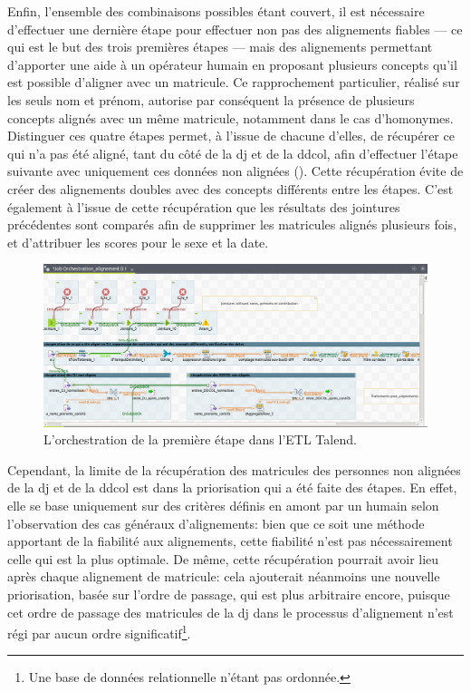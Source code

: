 \noindent Enfin, l'ensemble des combinaisons possibles étant couvert, il est nécessaire d'effectuer une dernière étape pour effectuer non pas des alignements fiables --- ce qui est le but des trois premières étapes --- mais des alignements permettant d'apporter une aide à un opérateur humain en proposant plusieurs concepts qu'il est possible d'aligner avec un matricule. Ce rapprochement particulier, réalisé sur les seuls nom et prénom, autorise par conséquent la présence de plusieurs concepts alignés avec un même matricule, notamment dans le cas d'homonymes.\\

Distinguer ces quatre étapes permet, à l'issue de chacune d'elles, de récupérer ce qui n'a pas été aligné, tant du côté de la \ac{dj} et de la \ac{ddcol}, afin d'effectuer l'étape suivante avec uniquement ces données non alignées (). Cette récupération évite de créer des alignements doubles avec des concepts différents entre les étapes. C'est également à l'issue de cette récupération que les résultats des jointures précédentes sont comparés afin de supprimer les matricules alignés plusieurs fois, et d'attribuer les scores pour le sexe et la date.\\
\begin{figure}[!h]
	\centering
	\includegraphics[width=14cm]{images/orchestration_partie1_dj.png}
	\caption{L'orchestration de la première étape dans l'ETL Talend.}
	\label{orchestration}
\end{figure}

Cependant, la limite de la récupération des matricules des personnes non alignées de la \ac{dj} et de la \ac{ddcol} est dans la priorisation qui a été faite des étapes. En effet, elle se base uniquement sur des critères définis en amont par un humain selon l'observation des cas généraux d'alignements: bien que ce soit une méthode apportant de la fiabilité aux alignements, cette fiabilité n'est pas nécessairement celle qui est la plus optimale. De même, cette récupération pourrait avoir lieu après chaque alignement de matricule: cela ajouterait néanmoins une nouvelle priorisation, basée sur l'ordre de passage, qui est plus arbitraire encore, puisque cet ordre de passage des matricules de la \ac{dj} dans le processus d'alignement n'est régi par aucun ordre significatif\footnote{Une base de données relationnelle n'étant pas ordonnée.}.

